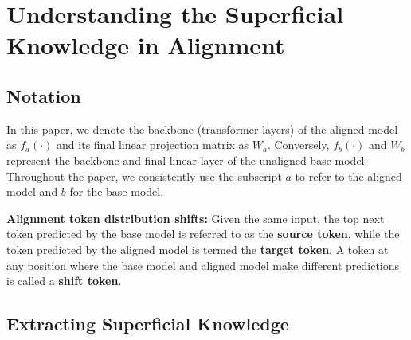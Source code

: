 

\section{Understanding the Superficial Knowledge in Alignment}




\subsection{Notation}


In this paper, we denote the backbone (transformer layers) of the aligned model as $f_a(\cdot)$ and its final linear projection matrix as $W_a$. Conversely, $f_b(\cdot)$ and $W_b$ represent the backbone and final linear layer of the unaligned base model. Throughout the paper, we consistently use the subscript $a$ to refer to the aligned model and $b$ for the base model.

\textbf{Alignment token distribution shifts:} Given the same input, the top next token predicted by the base model is referred to as the \textbf{source token}, while the token predicted by the aligned model is termed the \textbf{target token}. A token at any position where the base model and aligned model make different predictions is called a \textbf{shift token}.





\subsection{Extracting Superficial Knowledge}
\label{sec:linear}

